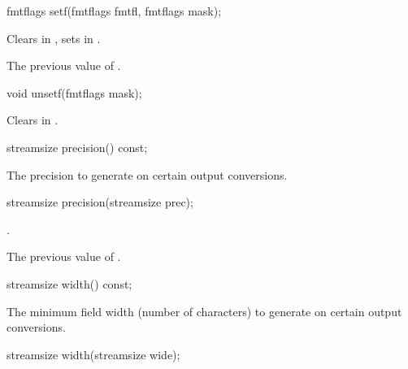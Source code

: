 %
\begin{itemdecl}
fmtflags setf(fmtflags fmtfl, fmtflags mask);
\end{itemdecl}

\begin{itemdescr}
\pnum
\effects
Clears  in
,
sets
in
.

\pnum
\returns
The previous value of
.
\end{itemdescr}

%
\begin{itemdecl}
void unsetf(fmtflags mask);
\end{itemdecl}

\begin{itemdescr}
\pnum
\effects
Clears  in
.
\end{itemdescr}

%
\begin{itemdecl}
streamsize precision() const;
\end{itemdecl}

\begin{itemdescr}
\pnum
\returns
The precision
to generate on certain output conversions.
\end{itemdescr}

%
\begin{itemdecl}
streamsize precision(streamsize prec);
\end{itemdecl}

\begin{itemdescr}
\pnum
\postcondition
{}.

\pnum
\returns
The previous value of
.
\end{itemdescr}

%
\begin{itemdecl}
streamsize width() const;
\end{itemdecl}

\begin{itemdescr}
\pnum
\returns
The minimum field width (number of characters) to generate on certain output
conversions.
\end{itemdescr}

%
\begin{itemdecl}
streamsize width(streamsize wide);
\end{itemdecl}

